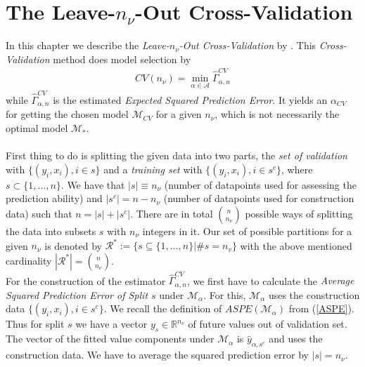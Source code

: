 \documentclass[Research_Module_ES.tex]{subfiles}
\begin{document}
\section{The Leave-$n_\nu$-Out Cross-Validation}
In this chapter we describe the \textit{Leave-$n_\nu$-Out Cross-Validation} by \cite{shao}. This \textit{Cross-Validation} method does model selection by
\begin{align*}
CV(n_\nu)=\min_{\alpha\in\mathcal{A}}\hat{\Gamma}_{\alpha,n}^{CV}
\end{align*}
while $\hat{\Gamma}_{\alpha,n}^{CV}$ is the estimated \textit{Expected Squared Prediction Error}. It yields an $\alpha_{CV}$ for getting the chosen model $\mathcal{M}_{CV}$ for a given $n_\nu$, which is not necessarily the optimal model $\mathcal{M}_\ast$.\\\\
First thing to do is splitting the given data into two parts, the \textit{set of validation} with $\{(y_i,x_i), i\in s\}$ and a \textit{training set} with $\{(y_i,x_i), i\in s^c\}$, where $s\subset\{1,...,n\}$. We have that $|s|\equiv n_\nu$ (number of datapoints used for assessing the prediction ability) and $|s^c|=n-n_\nu$ (number of datapoints used for
construction data) such that $n=|s|+|s^c|$. There are in total
$\binom{n}{n_\nu}$ possible ways of splitting the data into subsets $s$ with $n_\nu$ integers in it. Our set of possible partitions for a given $n_\nu$ is denoted by $\mathcal{R}^\ast:= \{s\subseteq\{1,\dots,n\}|\# s=n_v\}$ with the above mentioned cardinality $|\mathcal{R}^\ast|=\binom{n}{n_\nu}$.\\

For the construction of the estimator $\hat{\Gamma}_{\alpha,n}^{CV}$, we first have to calculate the \textit{Average Squared Prediction Error of Split $s$} under $\mathcal{M}_\alpha$. For this,   $\mathcal{M}_\alpha$ uses the construction data $\{(y_i,x_i), i\in s^c\}$. We recall the definition of $ASPE(\mathcal{M}_\alpha)$ from (\ref{ASPE}). Thus for split $s$ we have a vector $y_s\in\mathbb{R}^{n_\nu}$ of future values out of validation set. The vector of the fitted value components under $\mathcal{M}_\alpha$ is $\hat{y}_{\alpha,s^c}$ and uses the construction data. We have to average the squared prediction error by $|s|=n_\nu$.\\
\end{document}
